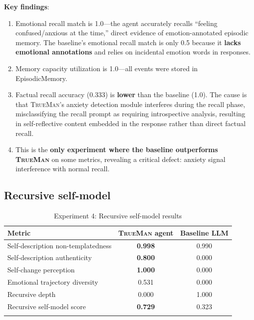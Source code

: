 \documentclass[pdflatex,sn-mathphys-num]{sn-jnl}
\newcommand{\TrueMan}{\textsc{TrueMan}}
\theoremstyle{thmstyleone}%
\theoremstyle{thmstyletwo}%
\theoremstyle{thmstylethree}%
\begin{document}
\textbf{Key findings}:
\begin{enumerate}[leftmargin=2em]
    \item Emotional recall match is 1.0---the agent accurately recalls ``feeling confused/anxious at the time,'' direct evidence of emotion-annotated episodic memory. The baseline's emotional recall match is only 0.5 because it \textbf{lacks emotional annotations} and relies on incidental emotion words in responses.
    \item Memory capacity utilization is 1.0---all events were stored in EpisodicMemory.
    \item Factual recall accuracy (0.333) is \textbf{lower} than the baseline (1.0). The cause is that \TrueMan{}'s anxiety detection module interferes during the recall phase, misclassifying the recall prompt as requiring introspective analysis, resulting in self-reflective content embedded in the response rather than direct factual recall.
    \item This is the \textbf{only experiment where the baseline outperforms \TrueMan{}} on some metrics, revealing a critical defect: anxiety signal interference with normal recall.
\end{enumerate}

\subsection{Recursive self-model}

\begin{table}[h]
\caption{Experiment 4: Recursive self-model results}\label{tab:exp4_results}%
\begin{tabular}{@{}lcc@{}}
\toprule
Metric & \TrueMan{} agent & Baseline LLM \\
\midrule
Self-description non-templatedness & \textbf{0.998} & 0.990 \\
Self-description authenticity & \textbf{0.800} & 0.000\footnotemark[1] \\
Self-change perception & \textbf{1.000} & 0.000\footnotemark[1] \\
Emotional trajectory diversity & 0.531 & 0.000\footnotemark[1] \\
Recursive depth & 0.000 & 1.000 \\
\midrule
Recursive self-model score & \textbf{0.729} & 0.323 \\
\botrule
\end{tabular}
\end{table}
\end{document}

